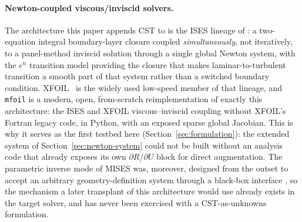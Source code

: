 \paragraph{Newton-coupled viscous/inviscid solvers.} The architecture this
paper appends CST to is the ISES lineage of \citet{drela1987viscous}: a
two-equation integral boundary-layer closure coupled \emph{simultaneously},
not iteratively, to a panel-method inviscid solution through a single global
Newton system, with the $e^n$ transition model providing the closure that
makes laminar-to-turbulent transition a smooth part of that system rather than
a switched boundary condition. XFOIL~\citep{drela1989xfoil} is the widely used
low-speed member of that lineage, and \texttt{mfoil}
\citep{fidkowski2022coupled} is a modern, open, from-scratch
reimplementation of exactly this architecture: the ISES and XFOIL
viscous--inviscid coupling without XFOIL's Fortran legacy code, in Python,
with an exposed sparse global Jacobian. This is why it serves as the first
testbed here (Section~\ref{sec:formulation}): the extended system of
Section~\ref{sec:newton-system} could not be built without an analysis code
that already exposes its own $\partial R/\partial U$ block for direct
augmentation. The parametric inverse mode of MISES was, moreover, designed
from the outset to accept an arbitrary geometry-definition system through a
black-box interface \citep{drela1990viscous}, so the mechanism a later
transplant of this architecture would use already exists in the target solver,
and has never been exercised with a CST-as-unknowns formulation.

